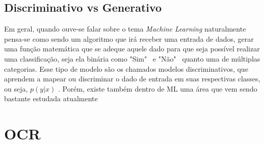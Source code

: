 \subsection{Discriminativo vs Generativo} \label{ssec:generative-vs-discriminative}

Em geral, quando ouve-se falar sobre o tema \textit{Machine Learning} naturalmente pensa-se como sendo um algoritmo que irá receber uma entrada de dados, gerar uma função matemática que se adeque aquele dado para que seja possível realizar uma classificação, seja ela binária como "Sim" \  e "Não" \  quanto uma de múltiplas categorias. Esse tipo de modelo são os chamados modelos discriminativos, que aprendem a mapear ou discriminar o dado de entrada em suas respectivas classes, ou seja, \(p(y | x)\) \cite{discriminative-vs-generative}. Porém, existe também dentro de ML uma área que vem sendo bastante estudada atualmente

\section{OCR}